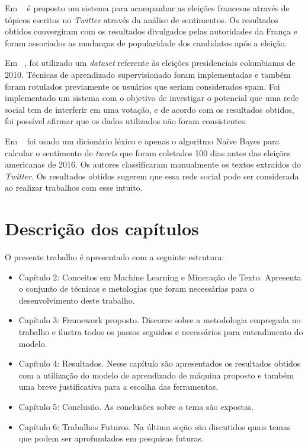 Em  ~\cite{wegrzyn2012tweets} é proposto um sistema para acompanhar as eleições francesas através de tópicos escritos no \textit{Twitter} através da análise de sentimentos.
Os resultados obtidos convergiram com os resultados divulgados pelas autoridades da França e foram associados as mudanças de popularidade dos candidatos após a eleição.



Em ~\cite{guzman}, foi utilizado um \textit{dataset} referente às eleições presidenciais colombianas de 2010. Técnicas de aprendizado supervisionado foram implementadas e também foram 
rotulados previamente os usuários que seriam considerados spam. Foi implementado um sistema com o objetivo de investigar o potencial que uma rede social tem de interferir em 
uma votação, e de acordo com os resultados obtidos, foi possível afirmar que os dados utilizados não foram consistentes.



Em ~\cite{joyce} foi usado um dicionário léxico e apenas o algoritmo Naïve Bayes para calcular o sentimento de \textit{tweets} que foram coletados 100 dias antes das eleições americanas
de 2016. Os autores classificaram manualmente os textos extraídos do \textit{Twitter}. Os resultados obtidos sugerem que essa rede social pode ser considerada ao realizar 
trabalhos com esse intuito.

\section{Descrição dos capítulos}

O presente trabalho é apresentado com a seguinte estrutura:

\begin{itemize}
	\item Capítulo 2: Conceitos em Machine Learning e Mineração de Texto. Apresenta o conjunto de técnicas
	      e metologias que foram necessárias para o desenvolvimento deste trabalho.
	\item Capítulo 3: Framework proposto. Discorre sobre a metodologia empregada no trabalho e ilustra todos os passos
	      seguidos e necessários para entendimento do modelo.
	\item Capítulo 4: Resultados. Nesse capítulo são apresentados os resultados obtidos com a utilização do modelo de aprendizado 
	      de máquina proposto e também uma breve justificativa para a escolha das ferramentas.
	\item Capítulo 5: Conclusão. As conclusões sobre o tema são expostas.
	\item Capítulo 6: Trabalhos Futuros. Na última seção são discutidos quais temas que podem ser aprofundados em pesquisas futuras.
\end{itemize}